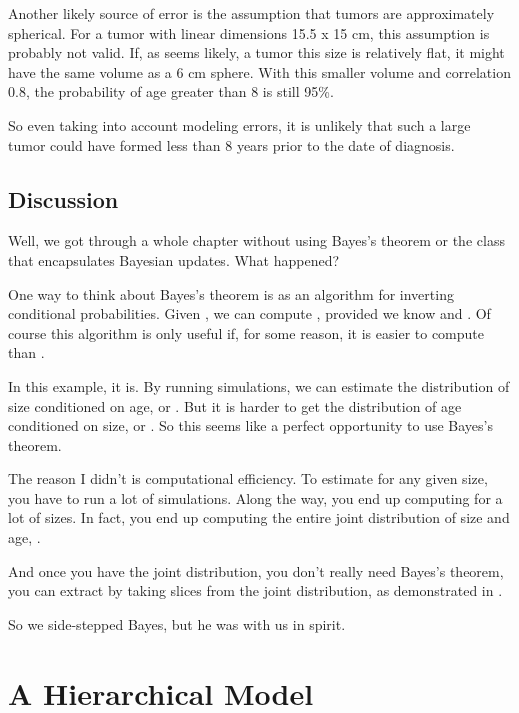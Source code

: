 \documentclass[12pt]{book}
\theoremstyle{exercise}
\begin{document}
Another likely source of error is the assumption that tumors are
approximately spherical.  For a tumor with linear dimensions 15.5 x 15
cm, this assumption is probably not valid.  If, as seems likely, a
tumor this size
is relatively flat, it might have the same volume as a 6 cm sphere.
With this smaller volume and correlation 0.8, the probability of age
greater than 8 is still 95\%.

So even taking into account modeling errors, it is unlikely that such
a large tumor could have formed less than 8 years prior to the date of
diagnosis.


\section{Discussion}

Well, we got through a whole chapter without using Bayes's theorem or
the  class that encapsulates Bayesian updates.  What
happened?

One way to think about Bayes's theorem is as an algorithm for
inverting conditional probabilities.  Given , we can compute
, provided we know  and .  Of course this algorithm
is only useful if, for some reason, it is easier to compute 
than .

In this example, it is.  By running simulations, we can estimate the
distribution of size conditioned on age, or .  But it is
harder to get the distribution of age conditioned on size, or
.  So this seems like a perfect opportunity to use Bayes's
theorem.

The reason I didn't is computational efficiency.  To estimate
 for any given size, you have to run a lot of simulations.
Along the way, you end up computing  for a lot of sizes.
In fact, you end up computing the entire joint distribution of size
and age, .

And once you have the joint distribution, you don't really need
Bayes's theorem, you can extract  by taking slices from
the joint distribution, as demonstrated in .

So we side-stepped Bayes, but he was with us in spirit.


\chapter{A Hierarchical Model}
\label{hierarchical}
\end{document}
